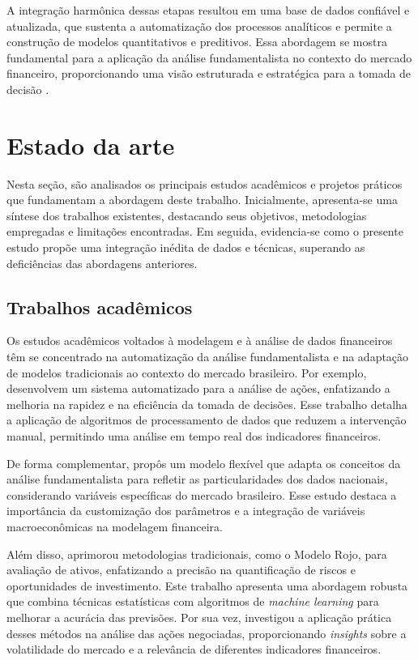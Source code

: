 A integração harmônica dessas etapas resultou em uma base de dados confiável e atualizada, que sustenta a automatização dos processos analíticos e permite a construção de modelos quantitativos e preditivos. Essa abordagem se mostra fundamental para a aplicação da análise fundamentalista no contexto do mercado financeiro, proporcionando uma visão estruturada e estratégica para a tomada de decisão \cite{costa:2024:integraccao, halevy:2006:data}.

\section{Estado da arte} \label{sec:estado-arte}

Nesta seção, são analisados os principais estudos acadêmicos e projetos práticos que fundamentam a abordagem deste trabalho. Inicialmente, apresenta-se uma síntese dos trabalhos existentes, destacando seus objetivos, metodologias empregadas e limitações encontradas. Em seguida, evidencia-se como o presente estudo propõe uma integração inédita de dados e técnicas, superando as deficiências das abordagens anteriores.

\subsection{Trabalhos acadêmicos}

Os estudos acadêmicos voltados à modelagem e à análise de dados financeiros têm se concentrado na automatização da análise fundamentalista e na adaptação de modelos tradicionais ao contexto do mercado brasileiro. Por exemplo, \citet{montoia:2021:automatizaccao} desenvolvem um sistema automatizado para a análise de ações, enfatizando a melhoria na rapidez e na eficiência da tomada de decisões. Esse trabalho detalha a aplicação de algoritmos de processamento de dados que reduzem a intervenção manual, permitindo uma análise em tempo real dos indicadores financeiros.

De forma complementar, \citet{deAraujo:2021:modelo} propôs um modelo flexível que adapta os conceitos da análise fundamentalista para refletir as particularidades dos dados nacionais, considerando variáveis específicas do mercado brasileiro. Esse estudo destaca a importância da customização dos parâmetros e a integração de variáveis macroeconômicas na modelagem financeira.

Além disso, \citet{delalibera:2023:automatizaccao} aprimorou metodologias tradicionais, como o Modelo Rojo, para avaliação de ativos, enfatizando a precisão na quantificação de riscos e oportunidades de investimento. Este trabalho apresenta uma abordagem robusta que combina técnicas estatísticas com algoritmos de \textit{machine learning} para melhorar a acurácia das previsões. Por sua vez, \citet{reis:2020:analise} investigou a aplicação prática desses métodos na análise das ações negociadas, proporcionando \textit{insights} sobre a volatilidade do mercado e a relevância de diferentes indicadores financeiros.

